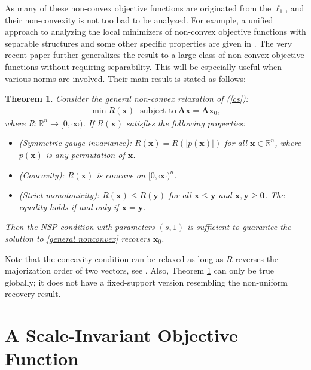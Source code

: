 \documentclass[11pt]{article}
\numberwithin{equation}{section}
\theoremstyle{plain}
\newtheorem{Th}{Theorem}[section]
\theoremstyle{definition}
\def\R{{\mathbb R}}
\def\R{{\mathbb R}}
\def\A{{\mathbf A}}
\def\x{{\mathbf x}}
\def\y{{\mathbf{y}}}
\begin{document}
As many of these non-convex objective functions are originated from the $\ell_1$, and their non-convexity is not too bad to be analyzed. For example, a unified approach to analyzing the local minimizers of non-convex objective functions with separable structures and some other specific properties are given in \cite{lv2009unified}. The very recent paper \cite{tran2017unified} further generalizes the result to a large class of non-convex objective functions without requiring separability. This will be especially useful when various norms are involved. Their main result is stated as follows:
\begin{Th}\label{general nonconxe Th}
Consider the general non-convex relaxation of (\ref{cs}):
\begin{align}
\min R(\x) \ \ \ \text{subject to}\ \A\x=\A\x_0,\label{general nonconvex}
\end{align}
where $R:\R^n\rightarrow [0, \infty)$. If $R(\x)$ satisfies the following properties:
\begin{itemize}
\item (Symmetric gauge invariance): $R(\x)=R(|p(\x)|)$ for all $\x\in\R^n$, where $p(\x)$ is any permutation of $\x$. 
\item (Concavity): $R(\x)$ is concave on $[0,\infty)^n$.  
\item (Strict monotonicity): $R(\x)\leq R(\y)$ for all $\x\leq \y$ and $\x, \y\geq \mathbf{0}$. The equality holds if and only if $\x=\y$.  
\end{itemize}
Then the NSP condition with parameters $(s,1)$ is sufficient to guarantee the solution to \ref{general nonconvex} recovers $\x_0$. 
\end{Th}
Note that the concavity condition can be relaxed as long as $R$ reverses the majorization order of two vectors, see \cite{tran2017unified}. Also, Theorem \ref{general nonconxe Th} can only be true globally; it does not have a fixed-support version resembling the non-uniform recovery result.  



    

\section{A Scale-Invariant Objective Function}\label{666}
\end{document}
